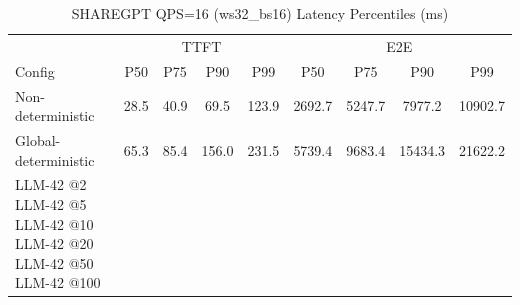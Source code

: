 \begin{table}[htbp]
\centering
\caption{SHAREGPT QPS=16 (ws32_bs16) Latency Percentiles (ms)}
\label{tab:sharegpt_qps16_ws32_bs16}
\begin{tabular}{l|cccc|cccc}
\toprule
& \multicolumn{4}{c|}{TTFT} & \multicolumn{4}{c}{E2E} \\
Config & P50 & P75 & P90 & P99 & P50 & P75 & P90 & P99 \\
\midrule
Non-deterministic & 28.5 & 40.9 & 69.5 & 123.9 & 2692.7 & 5247.7 & 7977.2 & 10902.7 \\
Global-deterministic & 65.3 & 85.4 & 156.0 & 231.5 & 5739.4 & 9683.4 & 15434.3 & 21622.2 \\
LLM-42 @2%
LLM-42 @5%
LLM-42 @10%
LLM-42 @20%
LLM-42 @50%
LLM-42 @100%
\bottomrule
\end{tabular}
\end{table}
